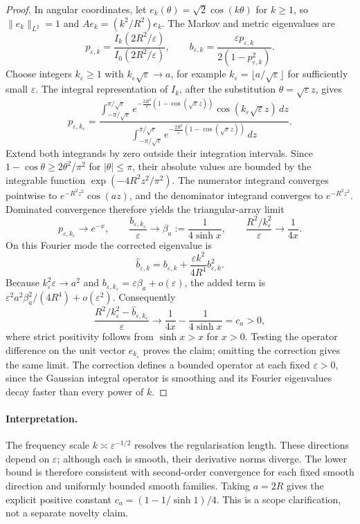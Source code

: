 \begin{proof}
In angular coordinates, let $e_k(\theta)=\sqrt2\cos(k\theta)$ for
$k\ge1$, so $\|e_k\|_{L^2}=1$ and $Ae_k=(k^2/R^2)e_k$.
The Markov and metric eigenvalues are
\[
 p_{\varepsilon,k}=
 \frac{I_k(2R^2/\varepsilon)}{I_0(2R^2/\varepsilon)},
 \qquad
 b_{\varepsilon,k}=
 \frac{\varepsilon p_{\varepsilon,k}}
      {2(1-p_{\varepsilon,k}^2)}.
\]
Choose integers $k_\varepsilon\ge1$ with
$k_\varepsilon\sqrt\varepsilon\to a$, for example
$k_\varepsilon=\lfloor a/\sqrt\varepsilon\rfloor$ for sufficiently
small $\varepsilon$.  The integral representation of $I_k$, after
the substitution $\theta=\sqrt\varepsilon z$, gives
\[
 p_{\varepsilon,k_\varepsilon}
 =\frac{
 \displaystyle\int_{-\pi/\sqrt\varepsilon}^{\pi/\sqrt\varepsilon}
 e^{-\frac{2R^2}{\varepsilon}(1-\cos(\sqrt\varepsilon z))}
 \cos(k_\varepsilon\sqrt\varepsilon z)\,dz}
 {\displaystyle\int_{-\pi/\sqrt\varepsilon}^{\pi/\sqrt\varepsilon}
 e^{-\frac{2R^2}{\varepsilon}(1-\cos(\sqrt\varepsilon z))}\,dz}.
\]
Extend both integrands by zero outside their integration intervals.
Since $1-\cos\theta\ge2\theta^2/\pi^2$ for $|\theta|\le\pi$,
their absolute values are bounded by the integrable function
$\exp(-4R^2z^2/\pi^2)$.  The numerator integrand converges pointwise
to $e^{-R^2z^2}\cos(az)$, and the denominator integrand converges
to $e^{-R^2z^2}$.  Dominated convergence therefore yields the
triangular-array limit
\[
 p_{\varepsilon,k_\varepsilon}\longrightarrow e^{-x},
 \qquad
 \frac{b_{\varepsilon,k_\varepsilon}}{\varepsilon}
   \longrightarrow\beta_a:=\frac1{4\sinh x},
 \qquad
 \frac{R^2/k_\varepsilon^2}{\varepsilon}
   \longrightarrow\frac1{4x}.
\]
On this Fourier mode the corrected eigenvalue is
\[
 \widehat b_{\varepsilon,k}
   =b_{\varepsilon,k}
     +\frac{\varepsilon k^2}{4R^4}b_{\varepsilon,k}^2.
\]
Because $k_\varepsilon^2\varepsilon\to a^2$ and
$b_{\varepsilon,k_\varepsilon}=\varepsilon\beta_a+o(\varepsilon)$,
the added term is
$\varepsilon^2a^2\beta_a^2/(4R^4)+o(\varepsilon^2)$.
Consequently
\[
 \frac{R^2/k_\varepsilon^2-
       \widehat b_{\varepsilon,k_\varepsilon}}{\varepsilon}
 \longrightarrow\frac1{4x}-\frac1{4\sinh x}=c_a>0,
\]
where strict positivity follows from $\sinh x>x$ for $x>0$.
Testing the operator difference on the unit vector
$e_{k_\varepsilon}$ proves the claim; omitting the correction gives
the same limit.  The correction defines a bounded operator at each
fixed $\varepsilon>0$, since the Gaussian integral operator is
smoothing and its Fourier eigenvalues decay faster than every
power of $k$.
\end{proof}

\paragraph{Interpretation.}
The frequency scale $k\asymp\varepsilon^{-1/2}$ resolves the
regularisation length.  These directions depend on $\varepsilon$;
although each is smooth, their derivative norms diverge.  The lower
bound is therefore consistent with second-order convergence for
each fixed smooth direction and uniformly bounded smooth families.
Taking $a=2R$ gives the explicit positive constant
$c_a=(1-1/\sinh1)/4$.  This is a scope clarification, not a separate
novelty claim.
